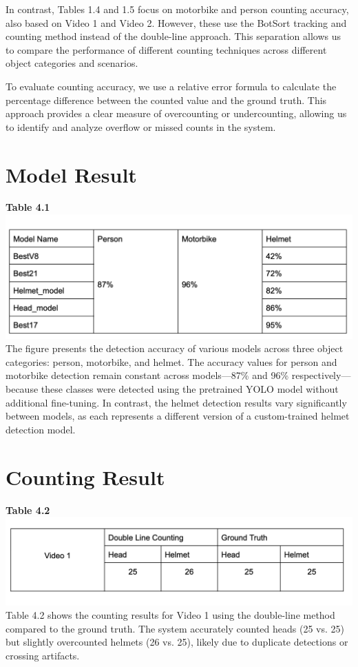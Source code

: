 \vspace{1em}
In contrast, Tables 1.4 and 1.5 focus on motorbike and person counting accuracy, also based on Video 1 and Video 2. However, these use the BotSort tracking and counting method instead of the double-line approach. This separation allows us to compare the performance of different counting techniques across different object categories and scenarios.

\vspace{1em}
To evaluate counting accuracy, we use a relative error formula to calculate the percentage difference between the counted value and the ground truth. This approach provides a clear measure of overcounting or undercounting, allowing us to identify and analyze overflow or missed counts in the system.


\section{Model Result}
\noindent\textbf{Table 4.1} \\
\includegraphics[width=1\textwidth]{model_result.png}
The figure presents the detection accuracy of various models across three object categories: person, motorbike, and helmet. The accuracy values for person and motorbike detection remain constant across models—87\% and 96\% respectively—because these classes were detected using the pretrained YOLO model without additional fine-tuning. In contrast, the helmet detection results vary significantly between models, as each represents a different version of a custom-trained helmet detection model.
\section{Counting Result}
\vspace{0.5em}
\noindent\textbf{Table 4.2} \\
\includegraphics[width=1\textwidth]{test1.png}
Table 4.2 shows the counting results for Video 1 using the double-line method compared to the ground truth. The system accurately counted heads (25 vs. 25) but slightly overcounted helmets (26 vs. 25), likely due to duplicate detections or crossing artifacts.


